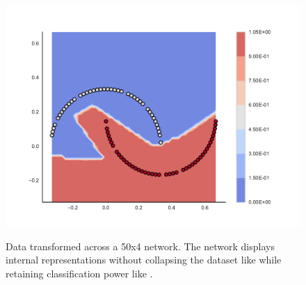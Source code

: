 \begin{figure}
{{{      \includegraphics[clip, trim=2.35cm 1.75cm 4.5cm 0cm,width=\hsize, height=\hsize]{img/toy/unitpointwise/output.pdf}
      }
    }
  }

    \caption{Data transformed across a 50x4 \SepUnitPoint network. The network displays internal representations without collapsing the dataset like \SepPoint while retaining classification power like \SepUnit.}
    \label{fig:moonsUnitPointwise}
\end{figure}

